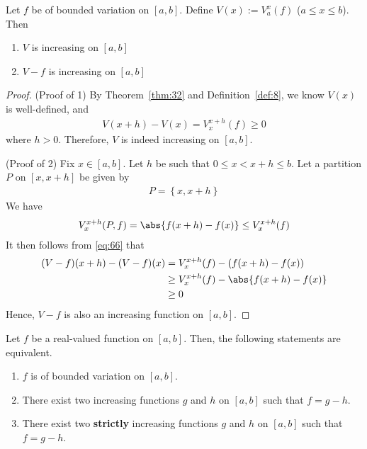 \documentclass[thmcnt=section, 12pt]{elegantbook}
\begin{document}

\begin{lemma} \label{lem:3}
    Let $f$ be of bounded variation on $[a, b]$. Define $V(x) := V_a^x(f)$ ($a \leq x \leq b$). Then 
    \begin{enumerate}
        \item $V$ is increasing on $[a, b]$
        \item $V-f$ is increasing on $[a, b]$
    \end{enumerate}
\end{lemma}

\begin{proof}
    (Proof of 1) By Theorem~\ref{thm:32} and Definition~\ref{def:8}, we know $V(x)$ is well-defined, and 
    \begin{align*}
        V(x+h) - V(x) = V_x^{x+h}(f) \geq 0
    \end{align*}
    where $h > 0$. Therefore, $V$ is indeed increasing on $[a, b]$.

    \par (Proof of 2) Fix $x \in [a, b]$. Let $h$ be such that $0 \leq x < x+h \leq b$. Let a partition $P$ on $[x, x+h]$ be given by 
    \begin{align*}
        P = \left\{x, x+h\right\}
    \end{align*}
    We have 
    \begin{align}
        V_x^{x+h}(P, f) = \abs{f(x+h) - f(x)} 
        \leq V_x^{x+h}(f)
        \label{eq:66}
    \end{align}
    It then follows from \eqref{eq:66} that 
    \begin{align*}
        (V-f)(x+h) - (V-f)(x)
        &= V_x^{x+h}(f) - (f(x+h) - f(x)) \\ 
        &\geq V_x^{x+h}(f) - \abs{f(x+h) - f(x)} \\ 
        &\geq 0
    \end{align*}
    Hence, $V-f$ is also an increasing function on $[a, b]$.
\end{proof}


\begin{theorem} \label{thm:33}
    Let $f$ be a real-valued function on $[a, b]$. Then, the following statements are equivalent.
    \begin{enumerate}
        \item $f$ is of bounded variation on $[a, b]$.
        \item There exist two increasing functions $g$ and $h$ on $[a, b]$ such that $f = g - h$.
        \item There exist two \textbf{strictly} increasing functions $g$ and $h$ on $[a, b]$ such that $f = g - h$.
    \end{enumerate}
\end{theorem}
\end{document}
